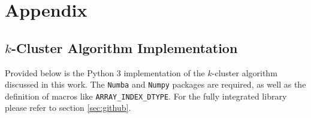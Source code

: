 \chapter*{Appendix}\label{chap:appendix}

\renewcommand{\thesection}{\Alph{section}.} %
\setcounter{section}{0} %

\section{$k$-Cluster Algorithm Implementation}
\label{sec:kclustercode}

Provided below is the Python 3 implementation of the $k$-cluster algorithm discussed in this work. The \texttt{Numba} and \texttt{Numpy} packages are required, as well as the definition of macros like \texttt{ARRAY\_INDEX\_DTYPE}. For the fully integrated library please refer to section \ref{sec:github}.


